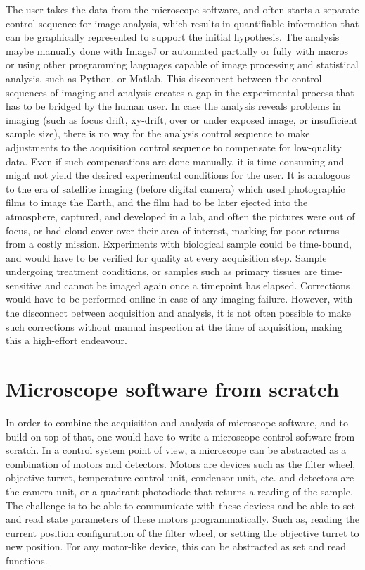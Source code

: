 The user takes the data from the microscope software, and often starts a separate control sequence for image analysis, which results in quantifiable information that can be graphically represented to support the initial hypothesis. The analysis maybe manually done with ImageJ or automated partially or fully with macros or using other programming languages capable of image processing and statistical analysis, such as Python, or Matlab. This disconnect between the control sequences of imaging and analysis creates a gap in the experimental process that has to be bridged by the human user. In case the analysis reveals problems in imaging (such as focus drift, xy-drift, over or under exposed image, or insufficient sample size), there is no way for the analysis control sequence to make adjustments to the acquisition control sequence to compensate for low-quality data. Even if such compensations are done manually, it is time-consuming and might not yield the desired experimental conditions for the user. It is analogous to the era of satellite imaging (before digital camera) which used photographic films to image the Earth, and the film had to be later ejected into the atmosphere, captured, and developed in a lab, and often the pictures were out of focus, or had cloud cover over their area of interest, marking for poor returns from a costly mission. Experiments with biological sample could be time-bound, and would have to be verified for quality at every acquisition step. Sample undergoing treatment conditions, or samples such as primary tissues are time-sensitive and cannot be imaged again once a timepoint has elapsed. Corrections would have to be performed online in case of any imaging failure. However, with the disconnect between acquisition and analysis, it is not often possible to make such corrections without manual inspection at the time of acquisition, making this a high-effort endeavour.


\section{Microscope software from scratch}
In order to combine the acquisition and analysis of microscope software, and to build on top of that, one would have to write a microscope control software from scratch. In a control system point of view, a microscope can be abstracted as a combination of motors and detectors. Motors are devices such as the filter wheel, objective turret, temperature control unit, condensor unit, etc. and detectors are the camera unit, or a quadrant photodiode that returns a reading of the sample. The challenge is to be able to communicate with these devices and be able to set and read state parameters of these motors programmatically. Such as, reading the current position configuration of the filter wheel, or setting the objective turret to new position. For any motor-like device, this can be abstracted as set and read functions.

